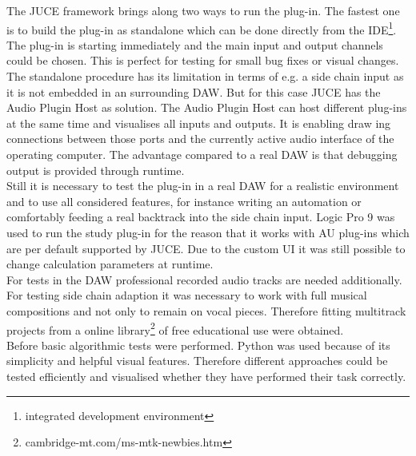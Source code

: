 The JUCE framework brings along two ways to run the plug-in. The fastest one is to build the plug-in as standalone which can be done directly from the IDE\footnote{integrated development environment}. The plug-in is starting immediately and the main input and output channels could be chosen. This is perfect for testing for small bug fixes or visual changes. The standalone procedure has its limitation in terms of e.g. a side chain input as it is not embedded in an surrounding DAW. But for this case JUCE has the Audio Plugin Host as solution. The Audio Plugin Host can host different plug-ins at the same time and visualises all inputs and outputs. It is enabling draw ing connections between those ports and the currently active audio interface of the operating computer. The advantage compared to a real DAW is that debugging output is provided through runtime.\\
Still it is necessary to test the plug-in in a real DAW for a realistic environment and to use all considered features, for instance writing an automation or comfortably feeding a real backtrack into the side chain input. Logic Pro 9 was used to run the study plug-in for the reason that it works with AU plug-ins which are per default supported by JUCE. Due to the custom UI it was still possible to change calculation parameters at runtime.\\
For tests in the DAW professional recorded audio tracks are needed additionally. For testing side chain adaption it was necessary to work with full musical compositions and not only to remain on vocal pieces. Therefore fitting multitrack projects from a online library\footnote{cambridge-mt.com/ms-mtk-newbies.htm} of free educational use were obtained.\\
Before basic algorithmic tests were performed. Python was used because of its simplicity and helpful visual features. Therefore different approaches could be tested efficiently and visualised whether they have performed their task correctly.\\
